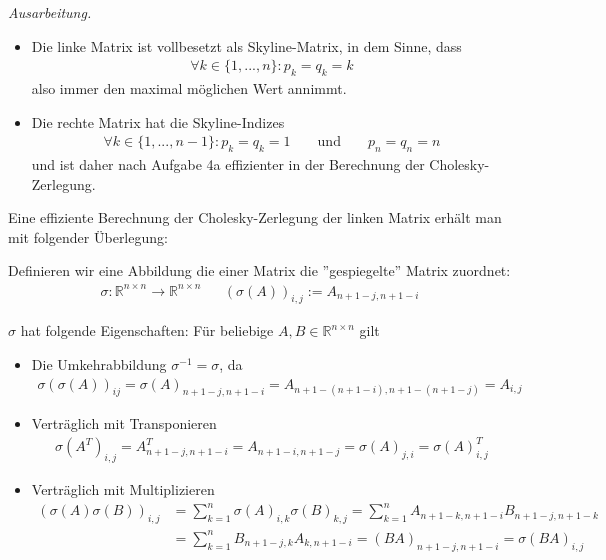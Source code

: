 \documentclass[titlepage]{article}
\newenvironment{ausarbeitung}{\vspace{3mm}\noindent\textit{Ausarbeitung.}}{}
\begin{document}
\begin{ausarbeitung}
	\begin{itemize}
		\item Die linke Matrix ist vollbesetzt als Skyline-Matrix, in dem Sinne, dass 
		\begin{align*}
			\forall k \in \{1, ..., n\}: p_k = q_k = k
		\end{align*}
		also immer den maximal möglichen Wert annimmt.
		
		\item Die rechte Matrix hat die Skyline-Indizes 
		\begin{align*}
			\forall k \in \{1, ..., n - 1\}: p_k = q_k = 1 && \text{ und } && p_n = q_n = n
		\end{align*}
		und ist daher nach Aufgabe 4a effizienter in der Berechnung der Cholesky-Zerlegung.
	\end{itemize}
	
	Eine effiziente Berechnung der Cholesky-Zerlegung der linken Matrix erhält man mit folgender Überlegung:
	
	Definieren wir eine Abbildung die einer Matrix die ''gespiegelte'' Matrix zuordnet:
	\begin{align*}
		\sigma: \mathbb{R}^{n\times n} \rightarrow \mathbb{R}^{n \times n} && (\sigma(A))_{i,j} := A_{n+1-j, n+1-i}
	\end{align*}
	
	$\sigma$ hat folgende Eigenschaften: Für beliebige $A,B \in \mathbb{R}^{n \times n}$ gilt
	
	\begin{itemize}
		\item Die Umkehrabbildung $\sigma^{-1} = \sigma$, da
			\begin{align*}
				\sigma(\sigma(A))_{ij} = \sigma(A)_{n+1-j,n+1-i} = A_{n+1-(n+1-i),n+1-(n+1-j)} = A_{i,j}
			\end{align*}
		
		\item Verträglich mit Transponieren
			\begin{align*}
				\sigma(A^T)_{i,j} = A^T_{n+1-j,n+1-i} = A_{n+1-i,n+1-j} = \sigma(A)_{j,i} = \sigma(A)^T_{i,j}
			\end{align*}
		\item Verträglich mit Multiplizieren
			\begin{align*}
				(\sigma(A)\sigma(B))_{i,j} &= \sum_{k=1}^{n}\sigma(A)_{i,k}\sigma(B)_{k,j} = \sum_{k=1}^{n} A_{n+1-k,n+1-i}B_{n+1-j,n+1-k} \\
				&= \sum_{k=1}^{n} B_{n+1-j,k}A_{k,n+1-i} = (BA)_{n+1-j,n+1-i} = \sigma(BA)_{i,j}
			\end{align*}
		

\end{itemize}
\end{ausarbeitung}
\end{document}
